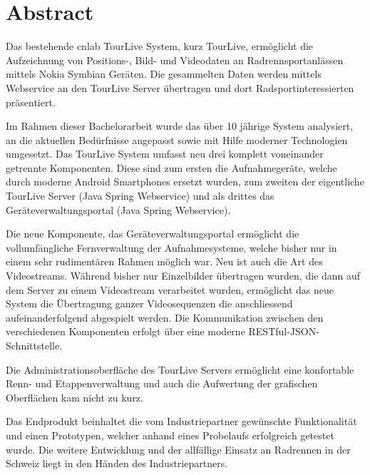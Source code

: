 \chapter*{Abstract}
Das bestehende cnlab TourLive System, kurz TourLive, ermöglicht die Aufzeichnung von Positions-, Bild- und Videodaten an Radrennsportanlässen mittels Nokia Symbian Geräten. Die gesammelten Daten werden mittels Webservice an den TourLive Server übertragen und dort Radsportinteressierten präsentiert.



Im Rahmen dieser Bachelorarbeit wurde das über 10 jährige System analysiert, an die aktuellen Bedürfnisse angepasst sowie mit Hilfe moderner Technologien umgesetzt. Das TourLive System umfasst neu drei komplett voneinander getrennte Komponenten. Diese sind zum ersten die Aufnahmegeräte, welche durch moderne Android Smartphones ersetzt wurden, zum zweiten der eigentliche TourLive Server (Java Spring Webservice) und als drittes das Geräteverwaltungsportal (Java Spring Webservice). 


Die neue Komponente, das Geräteverwaltungsportal ermöglicht die vollumfängliche Fernverwaltung der Aufnahmesysteme, welche bisher nur in einem sehr rudimentären Rahmen möglich war. Neu ist auch die Art des Videostreams. Während bisher nur Einzelbilder übertragen wurden, die dann auf dem Server zu einem Videostream verarbeitet wurden, ermöglicht das neue System die Übertragung ganzer Videosequenzen die anschliessend aufeinanderfolgend abgespielt werden. Die Kommunikation zwischen den verschiedenen Komponenten erfolgt über eine moderne RESTful-JSON-Schnittstelle. 


Die Administrationsoberfläche des TourLive Servers ermöglicht eine konfortable Renn- und Etappenverwaltung und auch die  Aufwertung der grafischen Oberflächen kam nicht zu kurz. 


Das Endprodukt beinhaltet die vom Industriepartner gewünschte Funktionalität und einen Prototypen, welcher anhand eines Probelaufs erfolgreich getestet wurde. Die weitere Entwicklung und der allfällige Einsatz an Radrennen in der Schweiz liegt in den Händen des Industriepartners.
